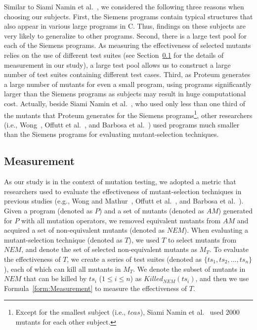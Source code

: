 Similar to Siami Namin et al.~\cite{SiamiNamin:08}, we considered
the following three reasons when choosing our subjects. First, the
Siemens programs contain typical structures that also appear in
various large programs in C. Thus, findings on these subjects are
very likely to generalize to other programs. Second, there is a
large test pool for each of the Siemens programs. As measuring the
effectiveness of selected mutants relies on the use of different
test suites (see Section~\ref{Measurement} for the details of
measurement in our study), a large test pool allows us to
construct a large number of test suites containing different test
cases. Third, as Proteum generates a large number of mutants for
even a small program, using programs significantly larger than the
Siemens programs as subjects may result in huge computational
cost. Actually, beside Siami Namin et al.~\cite{SiamiNamin:08},
who used only less than one third of the mutants that Proteum
generates for the Siemens programs\footnote{Except for the
smallest subject (i.e., $tcas$), Siami Namin et
al.~\cite{SiamiNamin:08} used 2000 mutants for each other
subject.}, other researchers (i.e., Wong~\cite{Wong:93}, Offutt et
al.~\cite{Offutt:96}, and Barbosa et al.~\cite{Barbosa:01}) used
programs much smaller than the Siemens programs for evaluating
mutant-selection techniques.


\vspace{-1ex}
\subsection{Measurement}
\label{Measurement}

As our study is in the context of mutation testing, we adopted a
metric that researchers used to evaluate the effectiveness of
mutant-selection techniques in previous studies (e.g., Wong and
Mathur~\cite{Wong:93,Wong:95}, Offutt et al.~\cite{Offutt:96}, and
Barbosa et al.~\cite{Barbosa:01}). Given a program (denoted as
$P$) and a set of mutants (denoted as $AM$) generated for $P$ with
all mutation operators, we removed equivalent mutants from $AM$
and acquired a set of non-equivalent mutants (denoted as $NEM$).
When evaluating a mutant-selection technique (denoted as $T$), we
used $T$ to select mutants from $NEM$, and denote the set of
selected non-equivalent mutants as $M_T$. To evaluate the
effectiveness of $T$, we create a series of test suites (denoted
as $\{ts_1, ts_2, ..., ts_n\}$), each of which can kill all
mutants in $M_T$. We denote the subset of mutants in $NEM$ that
can be killed by $ts_i$ ($1\leq$$i$$\leq$$n$) as
$Killed_{NEM}(ts_i)$, and then we use Formula~\ref{form:Measurement} to
measure the effectiveness of $T$.\vspace{-2ex}


